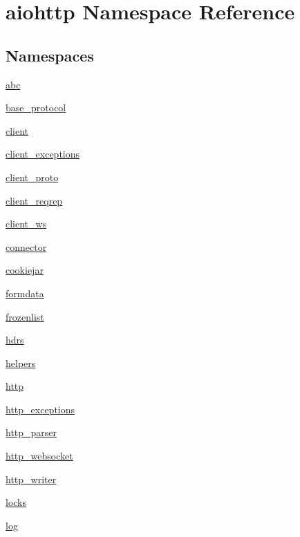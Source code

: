\hypertarget{namespaceaiohttp}{}\section{aiohttp Namespace Reference}
\label{namespaceaiohttp}
\subsection*{Namespaces}
\begin{DoxyCompactItemize}
\item 
 \hyperlink{namespaceaiohttp_1_1abc}{abc}
\item 
 \hyperlink{namespaceaiohttp_1_1base__protocol}{base\+\_\+protocol}
\item 
 \hyperlink{namespaceaiohttp_1_1client}{client}
\item 
 \hyperlink{namespaceaiohttp_1_1client__exceptions}{client\+\_\+exceptions}
\item 
 \hyperlink{namespaceaiohttp_1_1client__proto}{client\+\_\+proto}
\item 
 \hyperlink{namespaceaiohttp_1_1client__reqrep}{client\+\_\+reqrep}
\item 
 \hyperlink{namespaceaiohttp_1_1client__ws}{client\+\_\+ws}
\item 
 \hyperlink{namespaceaiohttp_1_1connector}{connector}
\item 
 \hyperlink{namespaceaiohttp_1_1cookiejar}{cookiejar}
\item 
 \hyperlink{namespaceaiohttp_1_1formdata}{formdata}
\item 
 \hyperlink{namespaceaiohttp_1_1frozenlist}{frozenlist}
\item 
 \hyperlink{namespaceaiohttp_1_1hdrs}{hdrs}
\item 
 \hyperlink{namespaceaiohttp_1_1helpers}{helpers}
\item 
 \hyperlink{namespaceaiohttp_1_1http}{http}
\item 
 \hyperlink{namespaceaiohttp_1_1http__exceptions}{http\+\_\+exceptions}
\item 
 \hyperlink{namespaceaiohttp_1_1http__parser}{http\+\_\+parser}
\item 
 \hyperlink{namespaceaiohttp_1_1http__websocket}{http\+\_\+websocket}
\item 
 \hyperlink{namespaceaiohttp_1_1http__writer}{http\+\_\+writer}
\item 
 \hyperlink{namespaceaiohttp_1_1locks}{locks}
\item 
 \hyperlink{namespaceaiohttp_1_1log}{log}

\end{DoxyCompactItemize}
